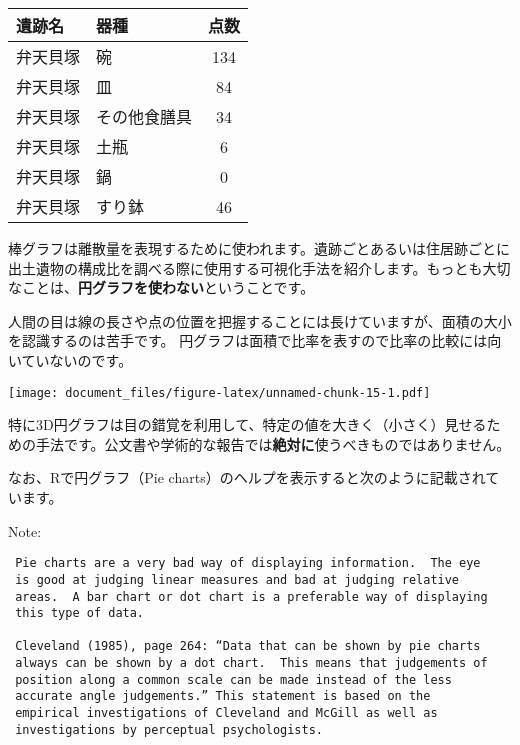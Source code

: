 \documentclass[]{article}
\newenvironment{Shaded}{\begin{snugshade}}{\end{snugshade}}
\newcommand{\DataTypeTok}[1]{\textcolor[rgb]{0.13,0.29,0.53}{#1}}
\newcommand{\KeywordTok}[1]{\textcolor[rgb]{0.13,0.29,0.53}{\textbf{#1}}}
\newcommand{\NormalTok}[1]{#1}
\newcommand{\OperatorTok}[1]{\textcolor[rgb]{0.81,0.36,0.00}{\textbf{#1}}}
\begin{document}
\begin{longtable}[]{@{}llc@{}}
\toprule
遺跡名 & 器種 & 点数\tabularnewline
\midrule
\endhead
弁天貝塚 & 碗 & 134\tabularnewline
弁天貝塚 & 皿 & 84\tabularnewline
弁天貝塚 & その他食膳具 & 34\tabularnewline
弁天貝塚 & 土瓶 & 6\tabularnewline
弁天貝塚 & 鍋 & 0\tabularnewline
弁天貝塚 & すり鉢 & 46\tabularnewline
\bottomrule
\end{longtable}

棒グラフは離散量を表現するために使われます。遺跡ごとあるいは住居跡ごとに出土遺物の構成比を調べる際に使用する可視化手法を紹介します。もっとも大切なことは、\textbf{円グラフを使わない}ということです。

人間の目は線の長さや点の位置を把握することには長けていますが、面積の大小を認識するのは苦手です。
円グラフは面積で比率を表すので比率の比較には向いていないのです。

\begin{Shaded}
\end{Shaded}

\texttt{[image: document\_files/figure-latex/unnamed-chunk-15-1.pdf]}

特に3D円グラフは目の錯覚を利用して、特定の値を大きく（小さく）見せるための手法です。公文書や学術的な報告では\textbf{絶対に}使うべきものではありません。

なお、Rで円グラフ（Pie
charts）のヘルプを表示すると次のように記載されています。

Note:

\begin{verbatim}
 Pie charts are a very bad way of displaying information.  The eye
 is good at judging linear measures and bad at judging relative
 areas.  A bar chart or dot chart is a preferable way of displaying
 this type of data.

 Cleveland (1985), page 264: “Data that can be shown by pie charts
 always can be shown by a dot chart.  This means that judgements of
 position along a common scale can be made instead of the less
 accurate angle judgements.” This statement is based on the
 empirical investigations of Cleveland and McGill as well as
 investigations by perceptual psychologists.
\end{verbatim}
\end{document}
